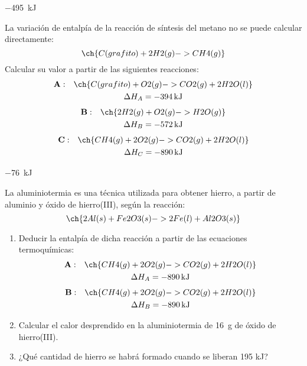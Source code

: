 \documentclass[10pt,a5paper,twoside]{article}
\begin{document}
  \begin{solution}
    \SI{-495}{\kilo\joule}
  \end{solution}




  \begin{exercise}[
      tags    = {termodinámica, entalpía, ley de Hess},
      topics  = {química, termoquímica, termodinámica},
      source  = {},
    ]
    La variación de entalpía de la reacción de síntesis del metano no se puede calcular directamente:
    \[ \ch{C(grafito) + 2 H2(g) -> CH4(g)}  \]
    Calcular su valor a partir de las siguientes reacciones:
    \begin{multline*}
      \mathbf{A:} \quad \ch{C(grafito) + O2(g) -> CO2(g) + 2 H2O(l)} \\
      \Delta H_A = \SI{-394}{\kilo\joule}
    \end{multline*}
    \begin{multline*}
      \mathbf{B:} \quad \ch{2 H2(g) + O2(g)-> H2O(g)} \\
      \Delta H_B = \SI{-572}{\kilo\joule}
    \end{multline*}
    \begin{multline*}
      \mathbf{C:} \quad \ch{CH4(g) + 2 O2(g) -> CO2(g) + 2 H2O(l)} \\
      \Delta H_C = \SI{-890}{\kilo\joule}
    \end{multline*}
  \end{exercise}

  \begin{solution}
    \SI{-76}{\kilo\joule}
  \end{solution}




  \begin{exercise}[
      tags    = {termodinámica, entalpía, ley de Hess},
      topics  = {química, termoquímica, termodinámica},
      source  = {},
    ]
    La aluminiotermia es una técnica utilizada para obtener hierro, a partir de aluminio y óxido de hierro(III), según la reacción:
    \[ \ch{2 Al(s) + Fe2O3(s) -> 2 Fe(l) + Al2O3(s)} \]
    \begin{enumerate}
      \item Deducir la entalpía de dicha reacción a partir de las ecuaciones termoquímicas:
        \begin{multline*}
          \mathbf{A:} \quad \ch{CH4(g) + 2 O2(g) -> CO2(g) + 2 H2O(l)} \\
          \Delta H_A = \SI{-890}{\kilo\joule}
        \end{multline*}
        \begin{multline*}
          \mathbf{B:} \quad \ch{CH4(g) + 2 O2(g) -> CO2(g) + 2 H2O(l)} \\
          \Delta H_B = \SI{-890}{\kilo\joule}
        \end{multline*}
      \item Calcular el calor desprendido en la aluminiotermia de \SI{16}{\gram} de óxido de hierro(III).
      \item ¿Qué cantidad de hierro se habrá formado cuando se liberan 195 kJ?
    \end{enumerate}
  \end{exercise}
\end{document}
